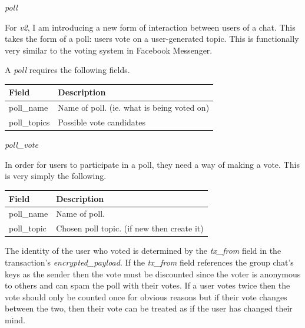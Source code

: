 \documentclass{article}
\begin{document}
\begin{center}
    \Large{\textit{poll}}
\end{center}
For \textit{v2}, I am introducing a new form of interaction between users of a chat. This takes the form of a poll: users vote on a user-generated topic. This is functionally very similar to the voting system in Facebook Messenger.

A \textit{poll} requires the following fields.
\begin{table}[H]
\centering
\begin{tabular}{|p{2.5cm}|p{8.5cm}|}
\hline
\rowcolor{tblgrey} 
Field           & Description                                               \\ \hline
poll\_name      & Name of poll. (ie. what is being voted on)                \\ \hline
poll\_topics    & Possible vote candidates                                  \\ \hline
\end{tabular}
\end{table}

\begin{center}
    \Large{\textit{poll\_vote}}
\end{center}
In order for users to participate in a poll, they need a way of making a vote. This is very simply the following.
\begin{table}[H]
\centering
\begin{tabular}{|p{2.5cm}|p{8.5cm}|}
\hline
\rowcolor{tblgrey} 
Field           & Description                                               \\ \hline
poll\_name      & Name of poll.                                             \\ \hline
poll\_topic     & Chosen poll topic. (if new then create it)                \\ \hline
\end{tabular}
\end{table}
The identity of the user who voted is determined by the \textit{tx\_from} field in the transaction's \textit{encrypted\_payload}. If the \textit{tx\_from} field references the group chat's keys as the sender then the vote must be discounted since the voter is anonymous to others and can spam the poll with their votes. If a user votes twice then the vote should only be counted once for obvious reasons but if their vote changes between the two, then their vote can be treated as if the user has changed their mind.
\end{document}
